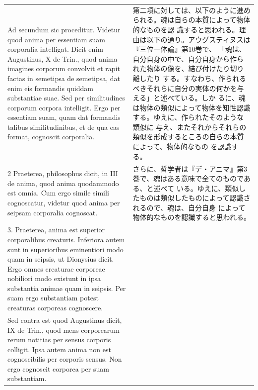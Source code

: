 \documentclass[paper=a4paper,fontsize=10pt,jafontsize=9pt,titlepage]{jlreq}
\begin{document}
\begin{longtable}{p{21em}p{21em}}
Ad secundum sic proceditur. Videtur quod anima per essentiam suam corporalia
intelligat. Dicit enim Augustinus, X de Trin., quod anima imagines corporum
convolvit et rapit factas in semetipsa de semetipsa, dat enim eis formandis
quiddam substantiae suae. Sed per similitudines corporum corpora
intelligit. Ergo per essentiam suam, quam dat formandis talibus similitudinibus,
et de qua eas format, cognoscit corporalia.

&

第二項に対しては、以下のように進められる。魂は自らの本質によって物体的なものを認
識すると思われる。理由は以下の通り。アウグスティヌスは『三位一体論』第10巻で、
「魂は、自分自身の中で、自分自身から作られた物体の像を、結び付けたり切り離したり
する。すなわち、作られるべきそれらに自分の実体の何かを与える」と述べている。しか
るに、魂は物体の類似によって物体を知性認識する。ゆえに、作られたそのような類似に
与え、またそれからそれらの類似を形成するところの自らの本質によって、物体的なもの
を認識する。

\\[1em]


2 Praeterea, philosophus dicit, in III de anima, quod
anima quodammodo est omnia. Cum ergo simile simili cognoscatur, videtur quod
anima per seipsam corporalia cognoscat.


&

 さらに、哲学者は『デ・アニマ』第3巻で、魂はある意味で全てのものである、と述べて
 いる。ゆえに、類似したものは類似したものによって認識されるので、魂は、自分自身
 によって物体的なものを認識すると思われる。


\\[1em]



3. Praeterea, anima est superior corporalibus creaturis. Inferiora autem sunt in
superioribus eminentiori modo quam in seipsis, ut Dionysius dicit. Ergo omnes
creaturae corporeae nobiliori modo existunt in ipsa substantia animae quam in
seipsis. Per suam ergo substantiam potest creaturas corporeas cognoscere.

&



\\[1em]


Sed contra est quod Augustinus dicit, IX de Trin., quod mens corporearum rerum
notitias per sensus corporis colligit. Ipsa autem anima non est cognoscibilis
per corporis sensus. Non ergo cognoscit corporea per suam substantiam.


\end{longtable}
\end{document}
